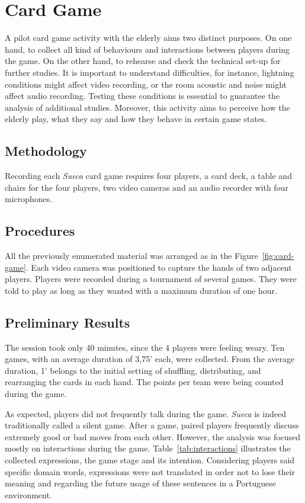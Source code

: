 \section{Card Game}

A pilot card game activity with the elderly aims two distinct purposes.
On one hand, to collect all kind of behaviours and interactions between players during the game.
On the other hand, to rehearse and check the technical set-up for further studies.
It is important to understand difficulties, for instance, lightning conditions might affect video recording, or the room acoustic and noise might affect audio recording.
Testing these conditions is essential to guarantee the analysis of additional studies.
Moreover, this activity aims to perceive how the elderly play, what they say and how they behave in certain game states.

\subsection{Methodology}
Recording each \emph{Sueca} card game requires four players, a card deck, a table and chairs for the four players, two video cameras and an audio recorder with four microphones.

\subsection{Procedures}
All the previously enumerated material was arranged as in the Figure~\ref{fig:card-game}.
Each video camera was positioned to capture the hands of two adjacent players.
Players were recorded during a tournament of several games.
They were told to play as long as they wanted with a maximum duration of one hour.

\subsection{Preliminary Results}
The session took only 40 minutes, since the 4 players were feeling weary.
Ten games, with an average duration of 3,75' each, were collected.
From the average duration, 1' belongs to the initial setting of shuffling, distributing, and rearranging the cards in each hand.
The points per team were being counted during the game.

As expected, players did not frequently talk during the game.
\emph{Sueca} is indeed traditionally called a silent game.
After a game, paired players frequently discuss extremely good or bad moves from each other.
However, the analysis was focused mostly on interactions during the game.
Table~\ref{tab:interactions} illustrates the collected expressions, the game stage and its intention.
Considering players said specific domain words, expressions were not translated in order not to lose their meaning and regarding the future usage of these sentences in a Portuguese environment.


